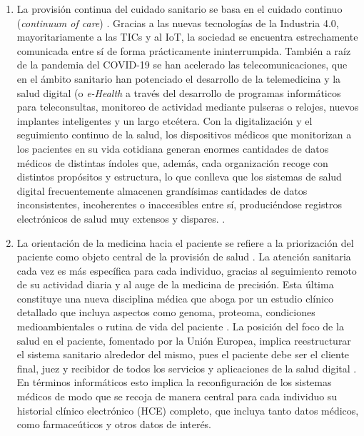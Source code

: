 \begin{enumerate}

\item La provisión continua del cuidado sanitario se basa en el cuidado continuo (\textit{continuum of care}) \cite{kouroubali2019new}. Gracias a las nuevas tecnologías de la Industria 4.0, mayoritariamente a las TICs y al IoT, la sociedad se encuentra estrechamente comunicada entre sí de forma prácticamente ininterrumpida. También a raíz de la pandemia del COVID-19 se han acelerado las telecomunicaciones, que en el ámbito sanitario han potenciado el desarrollo de la telemedicina y la salud digital (o \textit{e-Health} \cite{martin2021ehealth} a través del desarrollo de programas informáticos para teleconsultas, monitoreo de actividad mediante pulseras o relojes, nuevos implantes inteligentes y un largo etcétera. Con la digitalización y el seguimiento continuo de la salud, los dispositivos médicos que monitorizan a los pacientes en su vida cotidiana generan enormes cantidades de datos médicos de distintas índoles que, además, cada organización recoge con distintos propósitos y estructura, lo que conlleva que los sistemas de salud digital frecuentemente almacenen grandísimas cantidades de datos inconsistentes, incoherentes o inaccesibles entre sí, produciéndose registros electrónicos de salud muy extensos y dispares. \cite{kouroubali2019new}.

\item La orientación de la medicina hacia el paciente se refiere a la priorización del paciente como objeto central de la provisión de salud  \cite{tortorella2020healthcare}. La atención sanitaria cada vez es más específica para cada individuo, gracias al seguimiento remoto de su actividad diaria y al auge de la medicina de precisión. Esta última constituye una nueva disciplina médica que aboga por un estudio clínico detallado que incluya aspectos como genoma, proteoma, condiciones medioambientales o rutina de vida del paciente \cite{ruiz2023inteligencia}. La posición del foco de la salud en el paciente, fomentado por la Unión Europea,  implica reestructurar el sistema sanitario alrededor del mismo, pues el paciente debe ser el cliente final, juez y recibidor de todos los servicios y aplicaciones de la salud digital \cite{ntafi2022legal} \cite{katehakis2019framework}. En términos informáticos esto implica la reconfiguración de los sistemas médicos de modo que se recoja de manera central para cada individuo su historial clínico electrónico (HCE) completo, que incluya tanto datos médicos, como farmaceúticos y otros datos de interés.  


\end{enumerate}
